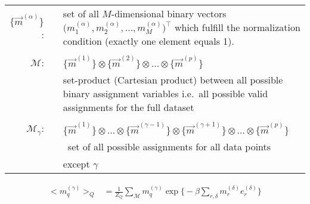 {\begin{frame}
 \begin{tabular}{r l p{9cm}}
$\big\{ \vec{m}^{(\alpha)} \big\}$: & & set of all $M$-dimensional binary vectors $\big( m_1^{(\alpha)}, m_2^{(\alpha)}, \ldots, 
  m_M^{(\alpha)} \big)^\top$ which fulfill the normalization condition (exactly one element equals 1). \\\\
$\mathscr{M}$: & & $\big\{ \vec{m}^{(1)} \big\} \otimes \big\{ \vec{m}^{(2)} \big\} \otimes \ldots \otimes \big\{ \vec{m}^{(p)} \big\}$\\
& & set-product (Cartesian product) between all possible binary assignment variables i.e.\ all possible valid assignments for the full dataset\\\\
$\mathscr{M}_{\gamma}$:& &  $\big\{ \vec{m}^{(1)} \big\} \otimes \ldots \otimes \big\{ \vec{m}^{(\gamma - 1)} \big\} \otimes
  \big\{ \vec{m}^{(\gamma + 1)} \big\} \otimes \ldots \otimes
  \big\{ \vec{m}^{(p)} \big\}$\\
& &\  set of all possible assignments for all data points  \\& & \hspace{0.03cm} except $\gamma$
\end{tabular}

\end{frame}

}

\begin{frame}
\begin{equation}
		\begin{array}{lll}
	\big< m_q^{(\gamma)} \big>_Q
	& = \frac{1}{Z_Q} \sum\limits_{\mathscr{M}} m_q^{(\gamma)}
		\exp \Big\{ -\beta \sum\limits_{r, \delta} 
		m_{r}^{(\delta)} e_{r}^{(\delta)} \Big\}
	\end{array}
\end{equation}


\end{frame}

